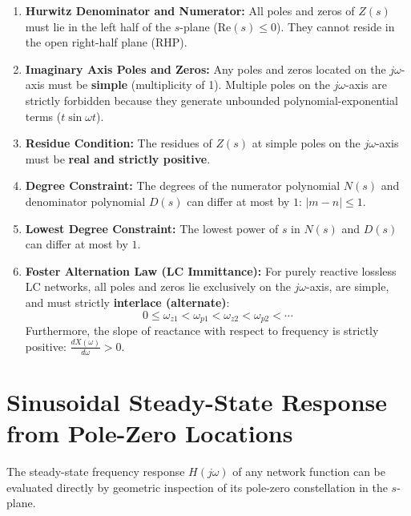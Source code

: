 \documentclass[12pt,a4paper]{article}
\begin{document}
\begin{tcolorbox}[formulabox, title={\textbf{Necessary and Sufficient Properties of Passive Immittance Functions}}]
\begin{enumerate}[leftmargin=*]
  \item \textbf{Hurwitz Denominator and Numerator:} All poles and zeros of $Z(s)$ must lie in the left half of the $s$-plane ($\text{Re}(s) \le 0$). They cannot reside in the open right-half plane (RHP).
  \item \textbf{Imaginary Axis Poles and Zeros:} Any poles and zeros located on the $j\omega$-axis must be \textbf{simple} (multiplicity of 1). Multiple poles on the $j\omega$-axis are strictly forbidden because they generate unbounded polynomial-exponential terms ($t\sin\omega t$).
  \item \textbf{Residue Condition:} The residues of $Z(s)$ at simple poles on the $j\omega$-axis must be \textbf{real and strictly positive}.
  \item \textbf{Degree Constraint:} The degrees of the numerator polynomial $N(s)$ and denominator polynomial $D(s)$ can differ at most by $1$: $|m - n| \le 1$.
  \item \textbf{Lowest Degree Constraint:} The lowest power of $s$ in $N(s)$ and $D(s)$ can differ at most by $1$.
  \item \textbf{Foster Alternation Law (LC Immittance):} For purely reactive lossless LC networks, all poles and zeros lie exclusively on the $j\omega$-axis, are simple, and must strictly \textbf{interlace (alternate)}:
  \begin{equation}
    0 \le \omega_{z1} < \omega_{p1} < \omega_{z2} < \omega_{p2} < \cdots
  \end{equation}
  Furthermore, the slope of reactance with respect to frequency is strictly positive: $\frac{dX(\omega)}{d\omega} > 0$.
\end{enumerate}
\end{tcolorbox}

\section{Sinusoidal Steady-State Response from Pole-Zero Locations}

The steady-state frequency response $H(j\omega)$ of any network function can be evaluated directly by geometric inspection of its pole-zero constellation in the $s$-plane.
\end{document}
